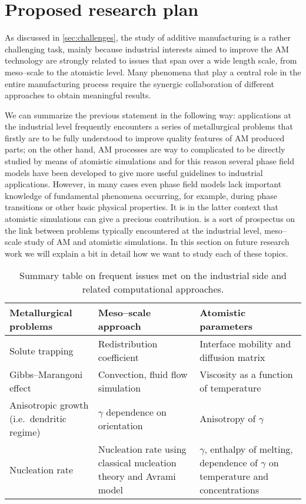 \chapter{Proposed research plan}
As discussed in \cref{sec:challenges}, the study of additive manufacturing is a rather challenging task, mainly because industrial interests aimed to improve the AM technology are strongly related to issues that span over a wide length scale, from meso--scale to the atomistic level. Many phenomena that play a central role in the entire manufacturing process require the synergic collaboration of different approaches to obtain meaningful results.

We can summarize the previous statement in the following way: applications at the industrial level frequently encounters a series of metallurgical problems that firstly are to be fully understood to improve quality features of AM produced parts; on the other hand, AM processes are way to complicated to be directly studied by means of atomistic simulations and for this reason several phase field models have been developed to give more useful guidelines to industrial applications. However, in many cases even phase field models lack important knowledge of fundamental phenomena occurring, for example, during phase transitions or other basic physical properties. It is in the latter context that atomistic simulations can give a precious contribution.  is a sort of prospectus on the link between problems typically encountered at the industrial level, meso--scale study of AM and atomistic simulations. In this section on future research work we will explain a bit in detail how we want to study each of these topics.

\begin{table}[tb]
\centering
\caption{Summary table on frequent issues met on the industrial side and related computational approaches.}
\label{tab:modeling_roadmap}
\begin{tabularx}{\textwidth}{*{3}{X}}
\toprule
    \textbf{Metallurgical problems} & \textbf{Meso--scale approach} & \textbf{Atomistic parameters} \\
    \midrule
    Solute trapping & Redistribution coefficient & Interface mobility and diffusion matrix \\
    Gibbs--Marangoni effect & Convection, fluid flow simulation & Viscosity as a function of temperature\\
    Anisotropic growth (i.e.\ dendritic regime) & $\gamma$ dependence on orientation & Anisotropy of $\gamma$ \\
    Nucleation rate & Nucleation rate using classical nucleation theory and Avrami model & $\gamma$, enthalpy of melting, dependence of $\gamma$ on temperature and concentrations\\
    \bottomrule 
\end{tabularx}
\end{table}

